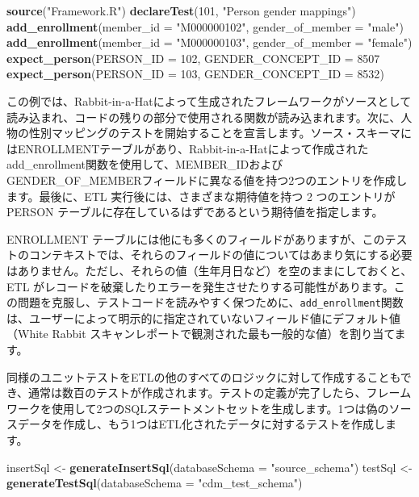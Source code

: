 \documentclass[
  11pt]{book}
\newenvironment{Shaded}{\begin{snugshade}}{\end{snugshade}}
\newcommand{\AttributeTok}[1]{\textcolor[rgb]{0.13,0.29,0.53}{#1}}
\newcommand{\DecValTok}[1]{\textcolor[rgb]{0.00,0.00,0.81}{#1}}
\newcommand{\FunctionTok}[1]{\textcolor[rgb]{0.13,0.29,0.53}{\textbf{#1}}}
\newcommand{\NormalTok}[1]{#1}
\newcommand{\OtherTok}[1]{\textcolor[rgb]{0.56,0.35,0.01}{#1}}
\newcommand{\StringTok}[1]{\textcolor[rgb]{0.31,0.60,0.02}{#1}}
\theoremstyle{definition}
\theoremstyle{definition}
\theoremstyle{definition}
\theoremstyle{definition}
\theoremstyle{remark}
\begin{document}
\begin{Shaded}
\begin{Highlighting}[]
\FunctionTok{source}\NormalTok{(}\StringTok{"Framework.R"}\NormalTok{)}
\FunctionTok{declareTest}\NormalTok{(}\DecValTok{101}\NormalTok{, }\StringTok{"Person gender mappings"}\NormalTok{)}
\FunctionTok{add\_enrollment}\NormalTok{(}\AttributeTok{member\_id =} \StringTok{"M000000102"}\NormalTok{, }\AttributeTok{gender\_of\_member =} \StringTok{"male"}\NormalTok{)}
\FunctionTok{add\_enrollment}\NormalTok{(}\AttributeTok{member\_id =} \StringTok{"M000000103"}\NormalTok{, }\AttributeTok{gender\_of\_member =} \StringTok{"female"}\NormalTok{)}
\FunctionTok{expect\_person}\NormalTok{(}\AttributeTok{PERSON\_ID =} \DecValTok{102}\NormalTok{, }\AttributeTok{GENDER\_CONCEPT\_ID =} \DecValTok{8507}
\FunctionTok{expect\_person}\NormalTok{(}\AttributeTok{PERSON\_ID =} \DecValTok{103}\NormalTok{, }\AttributeTok{GENDER\_CONCEPT\_ID =} \DecValTok{8532}\NormalTok{)}
\end{Highlighting}
\end{Shaded}

この例では、Rabbit-in-a-Hatによって生成されたフレームワークがソースとして読み込まれ、コードの残りの部分で使用される関数が読み込まれます。次に、人物の性別マッピングのテストを開始することを宣言します。ソース・スキーマにはENROLLMENTテーブルがあり、Rabbit-in-a-Hatによって作成されたadd\_enrollment関数を使用して、MEMBER\_IDおよびGENDER\_OF\_MEMBERフィールドに異なる値を持つ2つのエントリを作成します。最後に、ETL 実行後には、さまざまな期待値を持つ 2 つのエントリが PERSON テーブルに存在しているはずであるという期待値を指定します。

ENROLLMENT テーブルには他にも多くのフィールドがありますが、このテストのコンテキストでは、それらのフィールドの値についてはあまり気にする必要はありません。ただし、それらの値（生年月日など）を空のままにしておくと、ETL がレコードを破棄したりエラーを発生させたりする可能性があります。この問題を克服し、テストコードを読みやすく保つために、\texttt{add\_enrollment}関数は、ユーザーによって明示的に指定されていないフィールド値にデフォルト値（White Rabbit スキャンレポートで観測された最も一般的な値）を割り当てます。

同様のユニットテストをETLの他のすべてのロジックに対して作成することもでき、通常は数百のテストが作成されます。テストの定義が完了したら、フレームワークを使用して2つのSQLステートメントセットを生成します。1つは偽のソースデータを作成し、もう1つはETL化されたデータに対するテストを作成します。

\begin{Shaded}
\begin{Highlighting}[]
\NormalTok{insertSql }\OtherTok{\textless{}{-}} \FunctionTok{generateInsertSql}\NormalTok{(}\AttributeTok{databaseSchema =} \StringTok{"source\_schema"}\NormalTok{)}
\NormalTok{testSql }\OtherTok{\textless{}{-}} \FunctionTok{generateTestSql}\NormalTok{(}\AttributeTok{databaseSchema =} \StringTok{"cdm\_test\_schema"}\NormalTok{)}
\end{Highlighting}
\end{Shaded}
\end{document}

